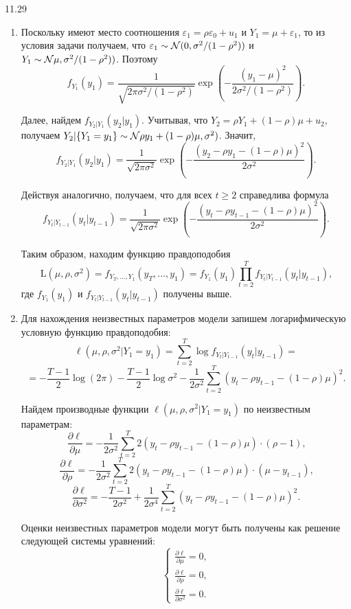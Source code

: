 \begin{solution}{{11.29}}
\begin{enumerate}
\item Поскольку имеют место соотношения $\varepsilon_1 = \rho \varepsilon_0 + u_1$ и $Y_1 =\mu + \varepsilon_1$, то из условия задачи получаем, что $\varepsilon_1 \sim \mathcal{N}(0,\sigma^2 / (1 - \rho^2))$
и $Y_1 \sim \mathcal{N}\mu,\sigma^2 / (1 - \rho^2))$. Поэтому
\[
f_{Y_1}(y_1) = \frac{1}{\sqrt{2\pi\sigma^2/(1-\rho^2)}}\exp{\left(-\frac{(y_1 - \mu)^2}{2\sigma^2/(1 - \rho^2)}\right)}.
\]

Далее, найдем $f_{Y_2|Y_1}(y_2|y_1)$. Учитывая, что $Y_2 = \rho Y_1 + (1- \rho) \mu + u_2$, получаем $Y_2|\{Y_1 = y_1\} \sim \mathcal{N}\rho y_1 + (1- \rho) \mu, \sigma^2)$. Значит,
\[
f_{Y_2|Y_1}(y_2|y_1) = \frac{1}{\sqrt{2\pi\sigma^2}}\exp{\left(-\frac{(y_2 - \rho y_1 - (1- \rho) \mu)^2}{2\sigma^2}\right)}.
\]

Действуя аналогично, получаем, что для всех $t \geq 2$ справедлива формула
\[
f_{Y_{t}|Y_{t-1}}(y_{t}|y_{t-1}) = \frac{1}{\sqrt{2\pi\sigma^2}}\exp{\left(-\frac{(y_{t} - \rho y_{t-1} - (1- \rho) \mu)^2}{2\sigma^2}\right)}.
\]

Таким образом, находим функцию правдоподобия
\[
\mathrm{L}(\mu, \rho, \sigma^2) = f_{Y_T,\ldots,Y_1}(y_T,\dots,y_1) = f_{Y_1}(y_1)\prod_{t=2}^{T}f_{Y_t|Y_{t-1}}(y_t|y_{t-1}) \text{,}
\]
где $f_{Y_1}(y_1)$ и $f_{Y_t|Y_{t-1}}(y_t|y_{t-1})$ получены выше.

\item Для нахождения неизвестных параметров модели запишем логарифмическую условную функцию правдоподобия:
\[
\ell(\mu, \rho, \sigma^2|Y_1 = y_1) = \sum_{t=2}^{T}\log{f_{Y_t|Y_{t-1}}(y_t|y_{t-1})} =
\]
\[
=-\frac{T-1}{2} \log(2 \pi) - \frac{T-1}{2} \log{\sigma^2} - \frac{1}{2\sigma^2} \sum_{t=2}^{T}(y_t - \rho y_{t-1} - (1 - \rho) \mu)^2 \text{.}
\]

Найдем производные функции $\ell(\mu, \rho, \sigma^2|Y_1 = y_1)$ по неизвестным параметрам:
\[
\frac{\partial \ell}{\partial \mu} = -\frac{1}{2\sigma^2} \sum_{t=2}^{T} 2(y_t - \rho y_{t-1} - (1 - \rho) \mu) \cdot (\rho - 1) \text{,}
\]
\[
\frac{\partial \ell}{\partial \rho} = -\frac{1}{2\sigma^2} \sum_{t=2}^{T} 2(y_t - \rho y_{t-1} - (1 - \rho) \mu) \cdot (\mu - y_{t-1}) \text{,}
\]
\[
\frac{\partial \ell}{\partial {\sigma^2}} =  - \frac{T-1}{2\sigma^2} + \frac{1}{2\sigma^4} \sum_{t=2}^{T}(y_t - \rho y_{t-1} - (1 - \rho) \mu)^2 \text{.}
\]

Оценки неизвестных параметров модели могут быть получены как решение следующей системы уравнений:
\[
\left\{
  \begin{aligned}
    \frac{\partial \ell}{\partial \mu} = 0 \text{,} \\
    \frac{\partial \ell}{\partial \rho} = 0 \text{,} \\
    \frac{\partial \ell}{\partial {\sigma^2}} = 0 \text{.}
  \end{aligned}
\right.
\]


\end{enumerate}
\end{solution}
